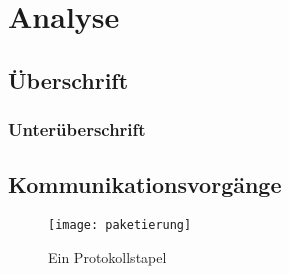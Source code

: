 \chapter{Analyse}

\section{Überschrift}

\subsection{Unterüberschrift}
\blindtext[2]
\section{Kommunikationsvorgänge}\label{sec:kommunikationsvorgange}

\begin{figure}
	\centering
	\texttt{[image: paketierung]}
	\caption{Ein Protokollstapel}
	\label{fig:paketierung}
\end{figure}
\blindtext[3]


